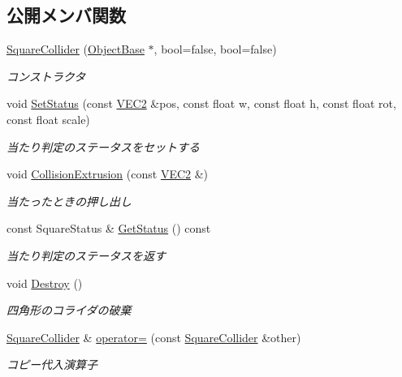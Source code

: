 \subsection*{公開メンバ関数}
\begin{DoxyCompactItemize}
\item 
\mbox{\hyperlink{class_square_collider_a354753b61e7fa39cb5e7aadcddb78910}{Square\+Collider}} (\mbox{\hyperlink{class_object_base}{Object\+Base}} $\ast$, bool=false, bool=false)
\begin{DoxyCompactList}\small\item\em コンストラクタ \end{DoxyCompactList}\item 
void \mbox{\hyperlink{class_square_collider_a11fbfdc35978ca8be47671a23719dbd4}{Set\+Status}} (const \mbox{\hyperlink{common_8h_afb0c5e21d4133ff4f200992c0b534e1b}{V\+E\+C2}} \&pos, const float w, const float h, const float rot, const float scale)
\begin{DoxyCompactList}\small\item\em 当たり判定のステータスをセットする \end{DoxyCompactList}\item 
void \mbox{\hyperlink{class_square_collider_a68cf6f1607d0d460e3a4ba31a49153d8}{Collision\+Extrusion}} (const \mbox{\hyperlink{common_8h_afb0c5e21d4133ff4f200992c0b534e1b}{V\+E\+C2}} \&)
\begin{DoxyCompactList}\small\item\em 当たったときの押し出し \end{DoxyCompactList}\item 
const Square\+Status \& \mbox{\hyperlink{class_square_collider_ac437bc1bed951c82ca25d2b17a7b2e0f}{Get\+Status}} () const
\begin{DoxyCompactList}\small\item\em 当たり判定のステータスを返す \end{DoxyCompactList}\item 
void \mbox{\hyperlink{class_square_collider_a83273e0e63692aa8020b8deedd456886}{Destroy}} ()
\begin{DoxyCompactList}\small\item\em 四角形のコライダの破棄 \end{DoxyCompactList}\item 
\mbox{\hyperlink{class_square_collider}{Square\+Collider}} \& \mbox{\hyperlink{class_square_collider_aaa648559b58219a455333f3a100c1d67}{operator=}} (const \mbox{\hyperlink{class_square_collider}{Square\+Collider}} \&other)
\begin{DoxyCompactList}\small\item\em コピー代入演算子 \end{DoxyCompactList}\end{DoxyCompactItemize}
